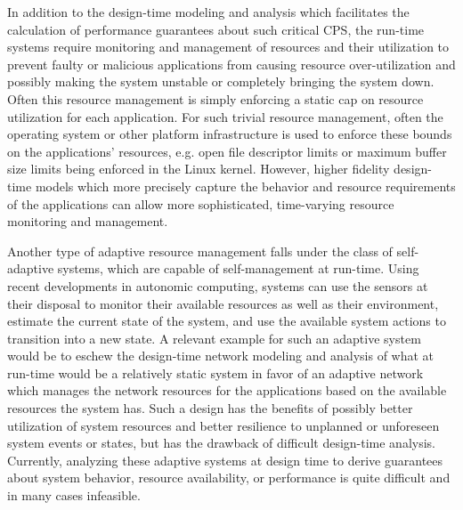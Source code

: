 In addition to the design-time modeling and analysis which facilitates the calculation of performance guarantees about such critical CPS, the run-time systems require monitoring and management of resources and their utilization to prevent faulty or malicious applications from causing resource over-utilization and possibly making the system unstable or completely bringing the system down.  Often this resource management is simply enforcing a static cap on resource utilization for each application.  For such trivial resource management, often the operating system or other platform infrastructure is used to enforce these bounds on the applications' resources, e.g. open file descriptor limits or maximum buffer size limits being enforced in the Linux kernel.  However, higher fidelity design-time models which more precisely capture the behavior and resource requirements of the applications can allow more sophisticated, time-varying resource monitoring and management. 

Another type of adaptive resource management falls under the class of self-adaptive systems, which are capable of self-management at run-time.  Using recent developments in autonomic computing, systems can use the sensors at their disposal to monitor their available resources as well as their environment, estimate the current state of the system, and use the available system actions to transition into a new state\cite{ibmAutonomicComputing2003}.  A relevant example for such an adaptive system would be to eschew the design-time network modeling and analysis of what at run-time would be a relatively static system in favor of an adaptive network which manages the network resources for the applications based on the available resources the system has.  Such a design has the benefits of possibly better utilization of system resources and better resilience to unplanned or unforeseen system events or states, but has the drawback of difficult design-time analysis.  Currently, analyzing these adaptive systems at design time to derive guarantees about system behavior, resource availability, or performance is quite difficult and in many cases infeasible.  

